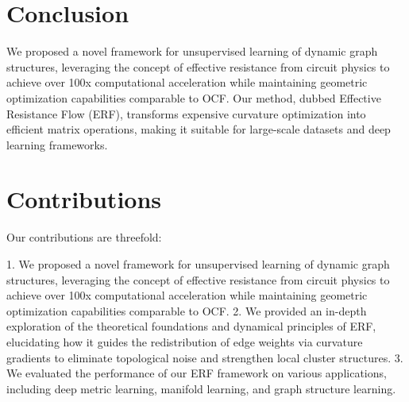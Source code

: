 \documentclass{article}
\begin{document}
\section{Conclusion}

We proposed a novel framework for unsupervised learning of dynamic graph structures, leveraging the concept of effective resistance from circuit physics to achieve over 100x computational acceleration while maintaining geometric optimization capabilities comparable to OCF. Our method, dubbed Effective Resistance Flow (ERF), transforms expensive curvature optimization into efficient matrix operations, making it suitable for large-scale datasets and deep learning frameworks.

\section{Contributions}

Our contributions are threefold:

1. We proposed a novel framework for unsupervised learning of dynamic graph structures, leveraging the concept of effective resistance from circuit physics to achieve over 100x computational acceleration while maintaining geometric optimization capabilities comparable to OCF.
2. We provided an in-depth exploration of the theoretical foundations and dynamical principles of ERF, elucidating how it guides the redistribution of edge weights via curvature gradients to eliminate topological noise and strengthen local cluster structures.
3. We evaluated the performance of our ERF framework on various applications, including deep metric learning, manifold learning, and graph structure learning.
\end{document}
